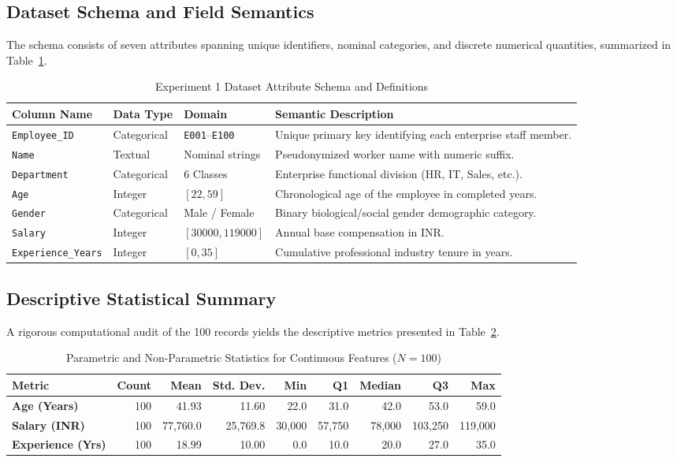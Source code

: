 \documentclass[12pt,a4paper]{report}
\begin{document}
\subsection{Dataset Schema and Field Semantics}
The schema consists of seven attributes spanning unique identifiers, nominal categories, and discrete numerical quantities, summarized in Table~\ref{tab:exp1_schema}.
\begin{table}[H]
\centering
\small
\caption{Experiment 1 Dataset Attribute Schema and Definitions}
\label{tab:exp1_schema}
\begin{tabularx}{\textwidth}{lllX}
\toprule
\textbf{Column Name} & \textbf{Data Type} & \textbf{Domain} & \textbf{Semantic Description} \\
\midrule
\texttt{Employee\_ID} & Categorical & \texttt{E001}--\texttt{E100} & Unique primary key identifying each enterprise staff member. \\
\texttt{Name} & Textual & Nominal strings & Pseudonymized worker name with numeric suffix. \\
\texttt{Department} & Categorical & 6 Classes & Enterprise functional division (HR, IT, Sales, etc.). \\
\texttt{Age} & Integer & $[22, 59]$ & Chronological age of the employee in completed years. \\
\texttt{Gender} & Categorical & Male / Female & Binary biological/social gender demographic category. \\
\texttt{Salary} & Integer & $[30000, 119000]$ & Annual base compensation in INR. \\
\texttt{Experience\_Years} & Integer & $[0, 35]$ & Cumulative professional industry tenure in years. \\
\bottomrule
\end{tabularx}
\end{table}

\subsection{Descriptive Statistical Summary}
A rigorous computational audit of the 100 records yields the descriptive metrics presented in Table~\ref{tab:exp1_stats}.
\begin{table}[H]
\centering
\footnotesize
\caption{Parametric and Non-Parametric Statistics for Continuous Features ($N=100$)}
\label{tab:exp1_stats}
\begin{tabularx}{\textwidth}{lrrrrrrrr}
\toprule
\textbf{Metric} & \textbf{Count} & \textbf{Mean} & \textbf{Std. Dev.} & \textbf{Min} & \textbf{Q1} & \textbf{Median} & \textbf{Q3} & \textbf{Max} \\
\midrule
\textbf{Age (Years)} & 100 & 41.93 & 11.60 & 22.0 & 31.0 & 42.0 & 53.0 & 59.0 \\
\textbf{Salary (INR)} & 100 & 77,760.0 & 25,769.8 & 30,000 & 57,750 & 78,000 & 103,250 & 119,000 \\
\textbf{Experience (Yrs)} & 100 & 18.99 & 10.00 & 0.0 & 10.0 & 20.0 & 27.0 & 35.0 \\
\bottomrule
\end{tabularx}
\end{table}
\end{document}
